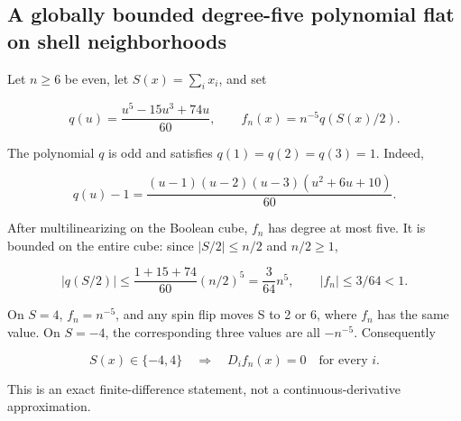 \subsection{A globally bounded degree-five polynomial flat on shell
neighborhoods}\label{proof:thin_shell_obstruction:a-globally-bounded-degree-five-polynomial-flat-on-shell-neighborhoods}

Let \(n\ge 6\) be even, let \(S(x)=\sum_i x_i\), and set

\[
q(u)=\frac{u^5-15u^3+74u}{60},\qquad f_n(x)=n^{-5}q(S(x)/2).
\tag{1.1}
\]

The polynomial \(q\) is odd and satisfies \(q(1)=q(2)=q(3)=1\). Indeed,

\[
q(u)-1=\frac{(u-1)(u-2)(u-3)(u^2+6u+10)}{60}.
\]

After multilinearizing on the Boolean cube, \(f_n\) has degree at most
five. It is bounded on the entire cube: since \(|S/2|\le n/2\) and
\(n/2\ge 1\),

\[
|q(S/2)|\le\frac{1+15+74}{60}(n/2)^5=\frac3{64}n^5,
\qquad |f_n|\le3/64<1.
\tag{1.2}
\]

On \(S=4\), \(f_n=n^{-5}\), and any spin flip moves S to 2 or 6, where
\(f_n\) has the same value. On \(S=-4\), the corresponding three values
are all \(-n^{-5}\). Consequently

\[
S(x)\in\{-4,4\}\quad\Longrightarrow\quad D_if_n(x)=0\quad\text{for every }i.
\tag{1.3}
\]

This is an exact finite-difference statement, not a
continuous-derivative approximation.
